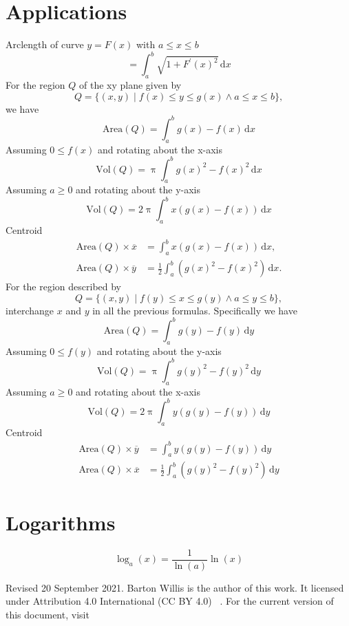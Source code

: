\documentclass[letterpaper,9pt,fleqn]{extarticle}
\begin{document}
\begin{multicols*}{3}
\section*{Applications}
Arclength of curve \(y = F(x)\) with \(a \leq x \leq b\)
\[
   = \int_a^b \sqrt{1 + F^\prime(x)^2} \, \mathrm{d} x
\]
For the region \(Q\) of the xy plane given by
\[
   Q = \{(x,y) \mid f(x) \leq y \leq g(x) \land a \leq x \leq b \},
\]
we have
\[
  \mbox{Area}(Q) = \int_a^b g(x) - f(x) \, \mathrm{d} x
\]  
Assuming \(0 \leq f(x)\) and rotating about the \mbox{x-axis}
\[
  \mbox{Vol}(Q) = \uppi \int_a^b g(x)^2 - f(x)^2 \, \mathrm{d} x
\]
Assuming \(a \geq 0\) and rotating about the y-axis
\[
  \mbox{Vol}(Q) = 2 \uppi \int_a^b x (g(x)  - f(x)) \, \mathrm{d} x
\]
Centroid
\begin{align*}
    \mbox{Area}(Q) \times \overline{x} &=  \int_a^b x \left(g(x) - f(x) \right) \, \mathrm{d} x, \\
     \mbox{Area}(Q) \times \overline{y} &=  \frac{1}{2} \int_a^b  \left (g(x)^2  - f(x)^2 \right) \, \mathrm{d} x.
\end{align*}
For the region described by
\[
   Q = \{(x,y) \mid f(y) \leq x \leq g(y) \land a \leq y \leq b \},
\]
interchange \(x\) and \(y\) in all the previous formulas. Specifically
we have
\[
  \mbox{Area}(Q) = \int_a^b g(y) - f(y) \, \mathrm{d} y
\]  
Assuming \(0 \leq f(y)\) and rotating about the \mbox{y-axis}
\[
  \mbox{Vol}(Q) = \uppi \int_a^b g(y)^2 - f(y)^2 \, \mathrm{d} y
\]
Assuming \(a \geq 0\) and rotating about the x-axis
\[
  \mbox{Vol}(Q) = 2 \uppi \int_a^b y (g(y)  - f(y)) \, \mathrm{d} y
\]
Centroid
\begin{align*}
    \mbox{Area}(Q) \times \overline{y} &=  \int_a^b y \left(g(y) - f(y) \right) \, \mathrm{d} y \\
     \mbox{Area}(Q) \times \overline{x} &=  \frac{1}{2} \int_a^b  \left (g(y)^2  - f(y)^2 \right) \, \mathrm{d} y
\end{align*}

\vspace{-0.25in}

  \section*{Logarithms}
  \vspace{-0.25in}
     \begin{equation*}
    \log_a(x) = \frac{1}{\ln(a)} \ln(x)
       \end{equation*}
       \vspace{-0.35in}


\vfill 

\noindent Revised 20 September 2021. Barton Willis is the author of this work. It 
licensed under Attribution 4.0 International (CC BY 4.0) \,  . For the current version of
this document, visit \,  
\end{multicols*}
\tiny  
\end{document}
